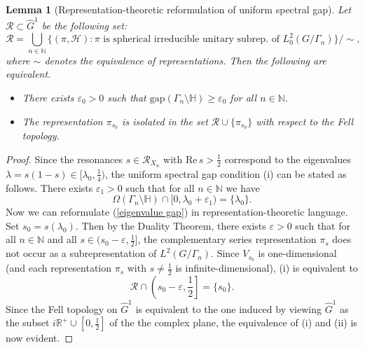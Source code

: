 \documentclass[12pt]{article}
\newtheorem{lem}[thm]{Lemma}
\newcommand{\RR}{\mathbb{R}}
\newcommand{\NN}{\mathbb{N}}
\newcommand{\R}{\mathrm{Re}\,}
\newcommand{\HH}{\mathbb{H}}
\begin{document}
\begin{lem}[Representation-theoretic reformulation of uniform spectral gap]\label{Intermediate}
Let $ \mathcal{R} \subset \hat{G}^{1} $ be the following set:
$$ \mathcal{R} = \bigcup_{n\in \mathbb{N}} \{ (\pi, \mathcal{H}) : \pi \text{ is spherical irreducible unitary subrep. of } L^{2}_{0}(G/\Gamma_{n}) \} / \sim, $$
where $ \sim $ denotes the equivalence of representations. Then the following are equivalent.
\begin{itemize}
\item[(i)] There exists $ \varepsilon_{0} > 0 $ such that $ \mathrm{gap}(\Gamma_{n}\setminus \HH) \geq \varepsilon_{0} $ for all $ n\in \NN $.
\item[(ii)] The representation $ \pi_{s_{0}} $ is isolated in the set $ \mathcal{R} \cup \{ \pi_{s_{0}}\} $ with respect to the Fell topology. 
\end{itemize} 
\end{lem}

\begin{proof}
Since the resonances $ s\in \mathcal{R}_{X_{n}} $ with $ \R s > \frac{1}{2} $ correspond to the eigenvalues $ \lambda = s(1-s)\in [\lambda_{0}, \frac{1}{4}) $, the uniform spectral gap condition (i) can be stated as follows. There exists $ \varepsilon_{1} > 0 $ such that for all $ n\in \NN $ we have
\begin{equation}\label{eigenvalue gap}
\Omega(\Gamma_{n}\setminus \HH) \cap [0, \lambda_{0} + \varepsilon_{1}) = \{ \lambda_{0} \}.
\end{equation} 
Now we can reformulate (\ref{eigenvalue gap}) in representation-theoretic language. Set $ s_{0} = s(\lambda_{0}). $ Then by the Duality Theorem, there exists $ \varepsilon > 0 $ such that for all $ n\in \NN $ and all $ s\in (s_{0}-\varepsilon, \frac{1}{2}] $, the complementary series representation $ \pi_{s} $ does not occur as a subrepresentation of $ L^{2}(G/\Gamma_{n}). $ Since $ V_{s_{0}} $ is one-dimensional (and each representation $ \pi_{s} $ with $ s\neq \frac{1}{2} $ is infinite-dimensional), (i) is equivalent to 
\begin{equation}\label{isolation}
\mathcal{R} \cap \left( s_{0}-\varepsilon, \frac{1}{2}\right] = \{  s_{0}\}. 
\end{equation}
Since the Fell topology on $ \hat{G}^{1} $ is equivalent to the one induced by viewing $ \hat{G}^{1} $ as the subset $ i\RR^{+} \cup \left[ 0, \frac{1}{2}\right] $ of the the complex plane, the equivalence of (i) and (ii) is now evident. 
\end{proof}
\end{document}
